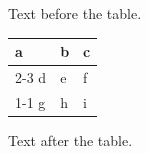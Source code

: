 \documentclass[12pt]{article}
\begin{document}
Text before the table.

\begin{tabular}{lll}a & b & c\\\cline{2-3} d & e & f\\\cline{1-1} g & h & i\end{tabular}

Text after the table.
\end{document}
